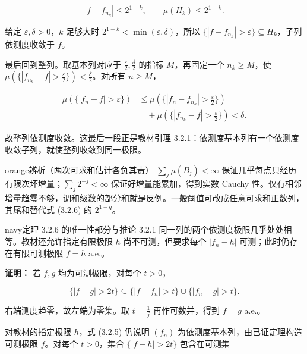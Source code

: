 \documentclass[11pt,a4paper]{article}
\begin{document}
\begin{equation*}
|f-f_{n_k}|\le2^{1-k},\qquad \mu(H_k)\le2^{1-k}.
\tag{3.2.7}
\end{equation*}

给定 \(\varepsilon,\delta>0\)，\(k\) 足够大时
\(2^{1-k}<\min(\varepsilon,\delta)\)，所以
\(\{|f-f_{n_k}|>\varepsilon\}\subseteq H_k\)，子列依测度收敛于 \(f\)。

最后回到整列。取基本列对应于 \(\frac\varepsilon2,\frac\delta2\) 的指标
\(M\)，再固定一个 \(n_k\ge M\)，使
\(\mu(\{|f_{n_k}-f|>\frac\varepsilon2\})<\frac\delta2\)。对所有
\(n\ge M\)，

\begin{equation*}
\begin{aligned}
\mu(\{|f_n-f|>\varepsilon\})
&\le\mu(\{|f_n-f_{n_k}|>\tfrac\varepsilon2\})\\
&\quad+\mu(\{|f_{n_k}-f|>\tfrac\varepsilon2\})<\delta.
\end{aligned}
\tag{3.2.8}
\end{equation*}

故整列依测度收敛。这最后一段正是教材引理
3.2.1：依测度基本列有一个依测度收敛子列，就使整列收敛到同一极限。

\begin{sboxenv}{orange}{辨析（两次可求和估计各负其责）}
\(\sum_j\mu(B_j)<\infty\)
保证几乎每点只经历有限次坏增量；\(\sum_j2^{-j}<\infty\)
保证好增量能累加，得到实数 Cauchy
性。仅有相邻增量趋零不够，调和级数的部分和就是反例。一般阈值可改成任意可求和正数列，其尾和替代式
(3.2.6) 的 \(2^{1-q}\)。

\end{sboxenv}

\begin{sboxenv}{navy}{定理 3.2.6 的唯一性部分与推论 3.2.1}
同一列的两个依测度极限几乎处处相等。教材还允许指定有限极限 \(h\)
尚不可测，但要求每个 \(|f_n-h|\) 可测；此时仍存在有限可测极限 \(f=h\)
a.e.。

\end{sboxenv}

\textbf{证明：} 若 \(f,g\) 均为可测极限，对每个 \(t>0\)，

\begin{equation*}
\{|f-g|>2t\}\subseteq\{|f-f_n|>t\}\cup\{|f_n-g|>t\}.
\end{equation*}

右端测度趋零，故左端为零集。取 \(t=\frac1j\) 再作可数并，得到 \(f=g\)
a.e.。

对教材的指定极限 \(h\)，式 (3.2.5) 仍说明 \((f_n)\)
为依测度基本列，由已证定理构造可测极限 \(f\)。对每个 \(t>0\)，集合
\(\{|f-h|>2t\}\) 包含在可测集
\end{document}
